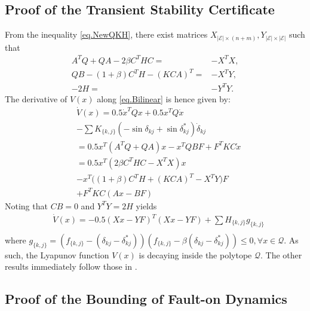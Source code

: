 \documentclass[final]{IEEEtran}
\begin{document}
\subsection{Proof of the Transient Stability Certificate}
\label{appen.NewQKH}

From  the inequality \eqref{eq.NewQKH}, there exist matrices
$X_{|\mathcal{E}| \times (n+m)}, Y_{|\mathcal{E}|
\times|\mathcal{E}|}$
  such that
\begin{align}
  A^TQ+QA -2\beta C^THC = & -X^TX, \nonumber \\
  QB-(1+\beta)C^TH-(KCA)^T = &-X^TY, \nonumber \\
  -2H =& -Y^TY. \nonumber
\end{align}
The derivative of $V(x)$ along \eqref{eq.Bilinear} is hence given
by:
\begin{align}
    &\dot{V}(x) = 0.5\dot{x}^T Q x+ 0.5x ^T Q\dot{x} \nonumber \\
    &-\sum K_{\{k,j\}}(-\sin\delta_{{kj}}+\sin\delta_{kj}^*)\dot{\delta}_{{kj}}
    \nonumber \\ &=0.5x^T(A^TQ+QA)x-x^TQBF   + F^TKC\dot{x} \nonumber \\
    &=0.5x^T(2\beta C^THC-X^TX)x  \nonumber \\ &- x^T\big((1+\beta)C^TH+(KCA)^T-X^TY\big)F
     \nonumber \\ &+ F^TKC(Ax-BF)
\end{align}
Noting that $CB=0$ and $Y^TY=2H$ yields
\begin{align}
 &\dot{V}(x)=-0.5(Xx-YF)^T(Xx-YF)    + \sum H_{\{k,j\}}g_{\{k,j\}} \nonumber \\
  \end{align}
where
$g_{\{k,j\}}=(f_{\{k,j\}}-(\delta_{kj}-\delta_{kj}^*))(f_{\{k,j\}}-\beta(\delta_{kj}-\delta_{kj}^*))
\le 0, \forall x\in \mathcal{Q}.$ As such, the Lyapunov function
$V(x)$ is decaying inside the polytope $\mathcal{Q}.$ The other
results immediately follow those in \cite{Vu:2014}.



\subsection{Proof of the Bounding of Fault-on Dynamics}
\label{appendix.BoundingCondition}
\end{document}
